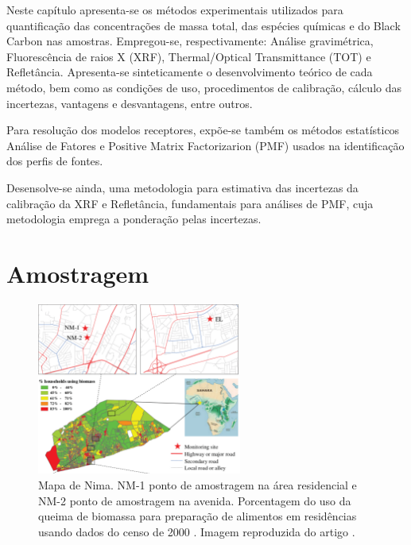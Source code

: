 Neste capítulo apresenta-se os métodos experimentais utilizados para 
quantificação das concentrações de massa total, das espécies químicas e 
do Black Carbon nas amostras. Empregou-se, respectivamente:
Análise gravimétrica, Fluorescência de raios X (XRF),
Thermal/Optical Transmittance (TOT) e Refletância.
Apresenta-se sinteticamente o desenvolvimento teórico de cada método, bem como 
as condições de uso, procedimentos de calibração, cálculo das incertezas, 
vantagens e desvantagens, entre outros.

Para resolução dos modelos receptores, expõe-se também os métodos 
estatísticos Análise de Fatores e Positive Matrix Factorizarion (PMF) 
usados na identificação dos perfis de fontes. 

Desensolve-se ainda, uma metodologia para estimativa das incertezas
da calibração da XRF e Refletância, fundamentais para análises de PMF,
cuja metodologia emprega a ponderação pelas incertezas.

\newpage
\section{Amostragem}

\begin{figure}[H]
\begin{center}
  \includegraphics[width=0.6\textwidth]{../inputs/images/zheng/nima_mapa.pdf}
  \caption{Mapa de Nima. NM-1 ponto de amostragem na área residencial e 
           NM-2 ponto de amostragem na avenida. Porcentagem do uso da queima
           de biomassa para preparação de alimentos em residências usando dados
           do censo de 2000 \citep{ghanacensus2003}. Imagem reproduzida do 
           artigo \citet{zhou2013}. \label{fig:nima_mapa}}
\end{center}
\end{figure}


